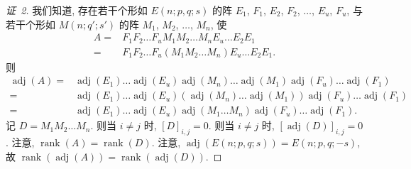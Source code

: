 \documentclass[../libro.tex]{subfiles}
\begin{document}
\begin{proof}[证~2]
    我们知道, 存在若干个形如
    \(E(n; p, q; s)\)
    的阵
    \(E_1\), \(F_1\), \(E_2\), \(F_2\),
    \(\dots\), \(E_u\), \(F_u\),
    与若干个形如 \(M(n; q'; s')\) 的阵
    \(M_1\), \(M_2\), \(\dots\), \(M_n\),
    使
    \begin{align*}
        A
        = {} &
        F_1 F_2 \dots F_u
        M_1 M_2 \dots M_n
        E_u \dots E_2 E_1
        \\
        = {} &
        F_1 F_2 \dots F_u
        (M_1 M_2 \dots M_n)
        E_u \dots E_2 E_1.
    \end{align*}
    则
    \begin{align*}
        \operatorname{adj} {(A)}
        = {} &
        \operatorname{adj} {(E_1)}
        \dots
        \operatorname{adj} {(E_u)}
        \operatorname{adj} {(M_n)}
        \dots
        \operatorname{adj} {(M_1)}
        \operatorname{adj} {(F_u)}
        \dots
        \operatorname{adj} {(F_1)}
        \\
        = {} &
        \operatorname{adj} {(E_1)}
        \dots
        \operatorname{adj} {(E_u)}
        (\operatorname{adj} {(M_n)}
            \dots
        \operatorname{adj} {(M_1)})
        \operatorname{adj} {(F_u)}
        \dots
        \operatorname{adj} {(F_1)}
        \\
        = {} &
        \operatorname{adj} {(E_1)}
        \dots
        \operatorname{adj} {(E_u)}
        \operatorname{adj} {(M_1 \dots M_n)}
        \operatorname{adj} {(F_u)}
        \dots
        \operatorname{adj} {(F_1)}.
    \end{align*}
    记 \(D = M_1 M_2 \dots M_n\).
    则当 \(i \neq j\) 时, \([D]_{i,j} = 0\).
    则当 \(i \neq j\) 时,
    \([\operatorname{adj} {(D)}]_{i,j} = 0\).
    注意, \(\operatorname{rank} {(A)}
    = \operatorname{rank} {(D)}\).
    注意, \(\operatorname{adj} {(E(n; p, q; s))}
    = E(n; p, q; -s)\),
    故 \(\operatorname{rank} {(\operatorname{adj} {(A)})}
    = \operatorname{rank} {(\operatorname{adj} {(D)})}\).


\end{proof}
\end{document}
